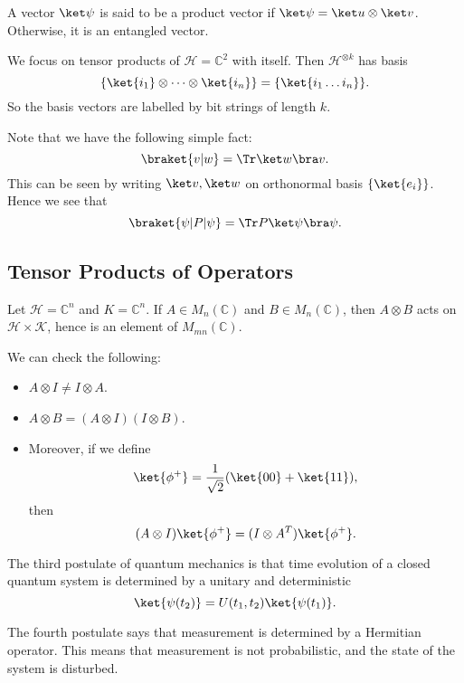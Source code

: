 \documentclass[12pt]{article}
\begin{document}
A vector $\ket \psi$ is said to be a product vector if $\ket \psi = \ket u \otimes \ket v$. Otherwise, it is an entangled vector.

We focus on tensor products of $\mathcal{H} = \mathbb{C}^2$ with itself. Then $\mathcal{H}^{\otimes k}$ has basis 
\[
	\{\ket{i_1} \otimes \cdots \otimes \ket{i_n}\} = \{ \ket{i_1 \ldots i_n}\}.
\]
So the basis vectors are labelled by bit strings of length $k$.


%


Note that we have the following simple fact:
\[
	\braket{v|w} = \Tr \ket w \bra v.
\]
This can be seen by writing $\ket v, \ket w$ on orthonormal basis $\{\ket{e_i}\}$. Hence we see that
\[
	\braket{\psi|P|\psi} = \Tr P\ket \psi \bra \psi.
\]

\subsection{Tensor Products of Operators}
\label{sub:ten_ops}

Let $\mathcal{H} = \mathbb{C}^n$ and $K = \mathbb{C}^n$. If $A \in M_n(\mathbb{C})$ and $B \in M_n(\mathbb{C})$, then $A \otimes B$ acts on $\mathcal{H} \times \mathcal{K}$, hence is an element of $M_{mn}(\mathbb{C})$.

We can check the following:
\begin{itemize}
	\item $A \otimes I \neq I \otimes A$.
	\item $A \otimes B = (A \otimes I)(I \otimes B)$.
	\item Moreover, if we define
		\[
			\ket{\phi^+} = \frac{1}{\sqrt 2} (\ket{00} + \ket{11}),
		\]
		then
		\[
			(A \otimes I)\ket{\phi^{+}} = (I \otimes A^{T}) \ket{\phi^{+}}.
		\]
\end{itemize}

The third postulate of quantum mechanics is that time evolution of a closed quantum system is determined by a unitary and deterministic
\[
	\ket{\psi(t_2)} = U(t_1, t_2) \ket{\psi(t_1)}.
\]

The fourth postulate says that measurement is determined by a Hermitian operator. This means that measurement is not probabilistic, and the state of the system is disturbed.
\end{document}
